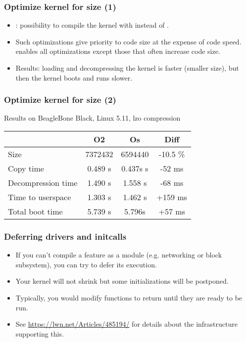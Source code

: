 \begin{frame}
\frametitle{Optimize kernel for size (1)}
\begin{itemize}
\item {}: possibility to compile the kernel
      with  instead of .
\item Such optimizations give priority to code size at the expense of code speed.
       enables all  optimizations except those that
      often increase code size.
\item Results: loading and decompressing the kernel is faster (smaller
      size), but then the kernel boots and runs slower.
\end{itemize}
\end{frame}

\begin{frame}
\frametitle{Optimize kernel for size (2)}
Results on BeagleBone Black, Linux 5.11, lzo compression
\begin{tabular}{| l || c | c | c |}
\hline
& O2 & Os & Diff \\
\hline
Size & 7372432 & 6594440 & -10.5 \% \\
Copy time &  0.489 s & 0.437s s & -52 ms \\
Decompression time & 1.490 s & 1.558 s & -68 ms \\
Time to userspace & 1.303 s & 1.462 s & +159 ms \\
Total boot time & 5.739 s & 5.796s & +57 ms \\
\hline
\end{tabular}
\newline\newline
\end{frame}

\begin{frame}
\frametitle{Deferring drivers and initcalls}
\begin{itemize}
\item If you can't compile a feature as a module (e.g. networking or block
      subsystem), you can try to defer its execution.
\item Your kernel will not shrink but some initializations will be
      postponed.
\item Typically, you would modify  functions to return
      \code{-} until they are ready to be run.
\item See \url{https://lwn.net/Articles/485194/} for details about the
      infrastructure supporting this.
\end{itemize}
\end{frame}

